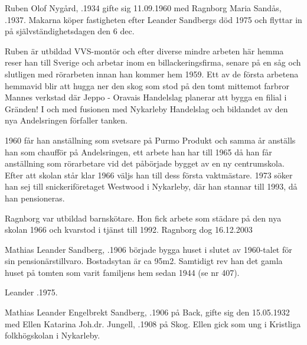 {{{{
Ruben Olof Nygård, .1934 gifte sig 11.09.1960 med Ragnborg Maria Sandås, .1937. Makarna köper fastigheten efter Leander Sandbergs död 1975 och flyttar in på självständighetsdagen den 6 dec.

Ruben är utbildad VVS-montör och efter diverse mindre arbeten här hemma reser han till Sverige och arbetar inom en billackeringsfirma, senare på en såg och slutligen med rörarbeten innan han kommer hem 1959. Ett av de första arbetena hemmavid blir att hugga ner den skog som stod på den tomt mittemot farbror Mannes verkstad där Jeppo - Oravais Handelslag planerar att bygga en filial i Gränden! I och med fusionen med Nykarleby Handelslag och bildandet av den nya Andelsringen förfaller tanken.

1960 får han anställning som svetsare på Purmo Produkt och samma år anställs han som chaufför på Andelsringen, ett arbete han har till 1965 då han får anställning som rörarbetare vid det påbörjade bygget av en ny centrumskola. Efter att skolan står klar 1966 väljs han till dess första vaktmästare. 1973 söker han sej till snickeriföretaget Westwood i Nykarleby, där han stannar till 1993, då han pensioneras.

Ragnborg var utbildad barnskötare. Hon fick arbete som städare på den nya skolan 1966 och kvarstod i tjänst till 1992. Ragnborg dog 16.12.2003
\begin{jhchildren}
  \item {}
  \item {}
  \item {}
\end{jhchildren}


Mathias Leander Sandberg, .1906 började bygga huset i slutet av 1960-talet för sin pensionärstillvaro. Bostadsytan är ca 95m2. Samtidigt rev han det gamla huset på tomten som varit familjens hem sedan 1944 (se nr 407).

Leander .1975.



Mathias Leander Engelbrekt Sandberg, .1906 på Back, gifte sig den 15.05.1932 med Ellen Katarina Joh.dr. Jungell, .1908 på Skog. Ellen gick som ung i Kristliga folkhögskolan i Nykarleby.

}}}}
